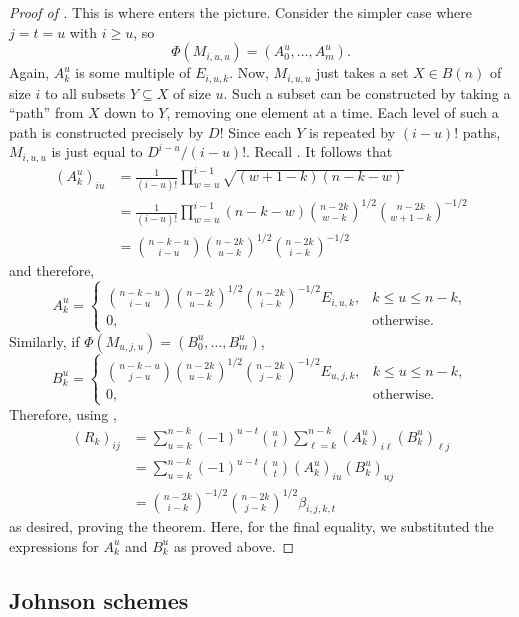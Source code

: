 \begin{proof}[Proof of ]
		This is where  enters the picture. Consider the simpler case where $j=t=u$ with $i \ge u$, so
		\[ \Phi(M_{i,u,u}) = (A_0^u,\ldots,A_m^u). \]
		Again, $A_k^u$ is some multiple of $E_{i,u,k}$. Now, $M_{i,u,u}$ just takes a set $X \in B(n)$ of size $i$ to all subsets $Y \subseteq X$ of size $u$. Such a subset can be constructed by taking a ``path'' from $X$ down to $Y$, removing one element at a time. Each level of such a path is constructed precisely by $D$! Since each $Y$ is repeated by $(i-u)!$ paths, $M_{i,u,u}$ is just equal to $D^{i-u}/(i-u)!$. Recall . It follows that
		\begin{align*}
			(A_k^u)_{iu} &= \frac{1}{(i-u)!} \prod_{w=u}^{i-1} \sqrt{(w+1-k)(n-k-w)} \\
				&= \frac{1}{(i-u)!} \prod_{w=u}^{i-1} (n-k-w) \binom{n-2k}{w-k}^{1/2} \binom{n-2k}{w+1-k}^{-1/2} \\
				&= \binom{n-k-u}{i-u} \binom{n-2k}{u-k}^{1/2} \binom{n-2k}{i-k}^{-1/2}
		\end{align*}
		and therefore,
		\[ A_k^u = \begin{cases} \binom{n-k-u}{i-u} \binom{n-2k}{u-k}^{1/2} \binom{n-2k}{i-k}^{-1/2} E_{i,u,k}, & k \le u \le n-k, \\ 0, & \text{otherwise.} \end{cases} \]
		Similarly, if $\Phi(M_{u,j,u}) = (B_0^u,\ldots,B_m^u)$,
		\[ B_k^u = \begin{cases} \binom{n-k-u}{j-u} \binom{n-2k}{u-k}^{1/2} \binom{n-2k}{j-k}^{-1/2} E_{u,j,k}, & k \le u \le n-k, \\ 0, & \text{otherwise.} \end{cases} \]
		Therefore, using ,
		\begin{align*}
			(R_k)_{ij} &= \sum_{u=k}^{n-k} (-1)^{u-t} \binom{u}{t} \sum_{\ell=k}^{n-k} (A_k^u)_{i\ell} (B_k^u)_{\ell j} \\
				&= \sum_{u=k}^{n-k} (-1)^{u-t} \binom{u}{t} (A_k^u)_{iu} (B_k^u)_{uj} \\
				&= \binom{n-2k}{i-k}^{-1/2} \binom{n-2k}{j-k}^{1/2} \beta_{i,j,k,t}
		\end{align*}
		as desired, proving the theorem. Here, for the final equality, we substituted the expressions for $A_k^u$ and $B_k^u$ as proved above.
	\end{proof}

\subsection{Johnson schemes}


